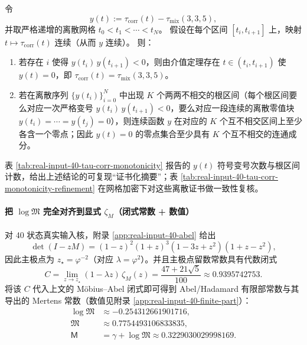 \begin{remark}\label{prop:chi-slice-sign-change-certificate}
令
\[
y(t):=\tau_{\mathrm{corr}}(t)-\tau_{\mathrm{mix}}(3,3,5),
\]
并取严格递增的离散网格 $t_0<t_1<\cdots<t_N$。
假设在每个区间 $[t_i,t_{i+1}]$ 上，映射 $t\mapsto \tau_{\mathrm{corr}}(t)$ 连续（从而 $y$ 连续）。
则：
\begin{enumerate}
  \item 若存在 $i$ 使得 $y(t_i)\,y(t_{i+1})<0$，则由介值定理存在 $t\in(t_i,t_{i+1})$ 使 $y(t)=0$，即 $\tau_{\mathrm{corr}}(t)=\tau_{\mathrm{mix}}(3,3,5)$。
  \item 若在离散序列 $\{y(t_i)\}_{i=0}^N$ 中出现 $K$ 个两两不相交的根区间（每个根区间要么对应一次严格变号 $y(t_i)\,y(t_{i+1})<0$，要么对应一段连续的离散零值块 $y(t_i)=\cdots=y(t_j)=0$），则连续函数 $y$ 在对应的 $K$ 个互不相交区间上至少各含一个零点；因此 $y(t)=0$ 的零点集合至少具有 $K$ 个互不相交的连通成分。
\end{enumerate}
表 \ref{tab:real-input-40-tau-corr-monotonicity} 报告的 $y(t)$ 符号变号次数与根区间计数，给出上述结论的可复现“证书化摘要”；表 \ref{tab:real-input-40-tau-corr-monotonicity-refinement} 在网格加密下对这些离散证书做一致性复核。
\end{remark}





\paragraph{把 \texorpdfstring{$\log\mathfrak{M}$}{logM} 完全对齐到显式 \texorpdfstring{$\zeta_M$}{zeta\_M}（闭式常数 + 数值）}
对 40 状态真实输入核，附录 \ref{app:real-input-40-abel} 给出
\[
\det(I-zM)=(1-z)^2(1+z)^3(1-3z+z^2)(1+z-z^2),
\]
因此主极点为 $z_\star=\varphi^{-2}$（对应 $\lambda=\varphi^2$）。并且主极点留数常数具有代数闭式
\[
C=\lim_{z\to z_\star}(1-\lambda z)\,\zeta_M(z)=\frac{47+21\sqrt5}{100}\approx 0.9395742753.
\]
将该 $C$ 代入上文的 Möbius--Abel 闭式即可得到 Abel/Hadamard 有限部常数与其导出的 Mertens 常数（数值见附录 \ref{app:real-input-40-finite-part}）：
\[
\begin{aligned}
\log\mathfrak{M}&\approx -0.254312661901716,\\
\mathfrak{M}&\approx 0.7754493106833835,\\
\mathsf{M}&=\gamma+\log\mathfrak{M}\approx 0.3229030029998169.
\end{aligned}
\]

